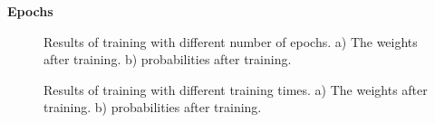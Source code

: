 \documentclass[10pt,a4paper]{article}
\begin{document}
\textbf{Epochs}

\begin{figure}[H]
    \centering
    \qquad
    \caption{Results of training with different number of epochs. a) The weights after training. b) probabilities after training.}
    \label{fig:off_line_learning_epochs}%
\end{figure}


\begin{figure}[H]
    \centering
    \qquad
    \caption{Results of training with different training times. a) The weights after training. b) probabilities after training.}
    \label{fig:off_line_learning_epochs2}%
\end{figure}
\end{document}
